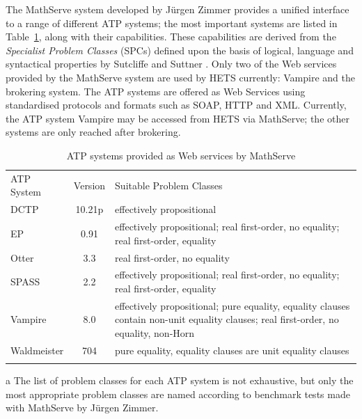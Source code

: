 \documentclass{article}
\newcommand{\normalTEXTSC}[2]{{#1\scriptsize#2}}
\newcommand     {\Hets}{\normalTEXTSC{H}{ETS}\xspace}
\newcommand     {\SPASS}{\normalTEXTSC{S}{PASS}\xspace}
\begin{document}
The MathServe system \cite{ZimmerAutexier06} developed by J\"{u}rgen
Zimmer provides a unified interface to a range of different ATP
systems; the most important systems are listed in
Table~\ref{tab:MathServe}, along with their capabilities. These
capabilities are derived from the \emph{Specialist Problem Classes}
(SPCs) defined upon the basis of logical, language and syntactical
properties by Sutcliffe and Suttner \cite{SutcliffeEA:2001:EvalATP}.
Only two of the Web services provided by the MathServe system are used
by \Hets currently: Vampire and the brokering system.  The ATP systems
are offered as Web Services using standardised protocols and formats
such as SOAP, HTTP and XML.  Currently, the ATP system Vampire may be
accessed from \Hets via MathServe; the other systems are only reached
after brokering.

\begin{table}[t]
  \centering
  \begin{threeparttable}
    \begin{tabular}{|l|c|p{7cm}|}\firsthline
      ATP System & Version & Suitable Problem Classes\tnote{a}\\
      \hhline{|=|=|=|}
      DCTP & 10.21p & effectively propositional \\\hline
      EP & 0.91 & effectively propositional; real first-order, no
      equality; real first-order, equality\\\hline
      Otter & 3.3 & real first-order, no equality\\\hline
      \SPASS & 2.2 & effectively propositional; real first-order, no
      equality; real first-order, equality\\\hline
      Vampire & 8.0 & effectively propositional; pure equality, equality
      clauses contain non-unit equality clauses; real first-order, no
      equality, non-Horn\\\hline
      Waldmeister & 704 & pure equality, equality clauses are unit
      equality clauses\\\lasthline
    \end{tabular}
    \begin{tablenotes}\footnotesize
    \item[a]
      {The list of problem classes for each ATP system is not
        exhaustive, but only the most appropriate problem classes are
        named according to benchmark tests made with MathServe by
        J\"urgen Zimmer.}
    \end{tablenotes}
  \end{threeparttable}
  \caption{ATP systems provided as Web services by MathServe}
\vspace*{-4mm}
  \label{tab:MathServe}
\end{table}
\end{document}
